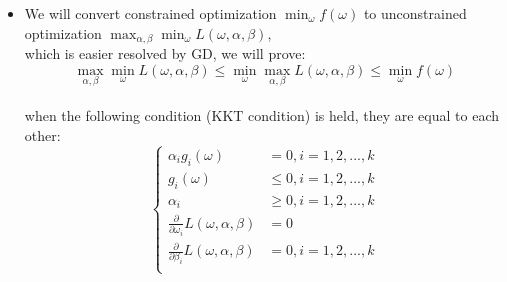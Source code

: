 \begin{frame}
	\small
	\begin{itemize}
		\item We will convert constrained optimization $\min_\omega f(\omega)$ to unconstrained optimization $\max_{\alpha,\beta}\min_{\omega}L(\omega,\alpha,\beta)$, \\which is easier resolved by GD, we will prove:
			\begin{equation*}
				\max_{\alpha,\beta}\min_{\omega}L(\omega,\alpha,\beta)
				\leq
				\min_{\omega}\max_{\alpha,\beta}L(\omega,\alpha,\beta)
				\leq
				\min_\omega f(\omega)
			\end{equation*}\\
		when the following condition (KKT condition) is held, they are equal to each other:
			\scriptsize
			\begin{equation*}
				\left\{
					\begin{aligned}
						\alpha_ig_i(\omega) &=0, i=1,2,...,k\\
						g_i(\omega) &\leq 0, i=1,2,...,k\\
						\alpha_i &\geq 0, i=1,2,...,k\\
						\frac{\partial}{\partial\omega_i}L(\omega,\alpha,\beta)&=0\\
						\frac{\partial}{\partial\beta_i}L(\omega,\alpha,\beta)&=0, i=1,2,...,k\\
					\end{aligned}
				\right.
			\end{equation*}\\
	\end{itemize}
\end{frame}
